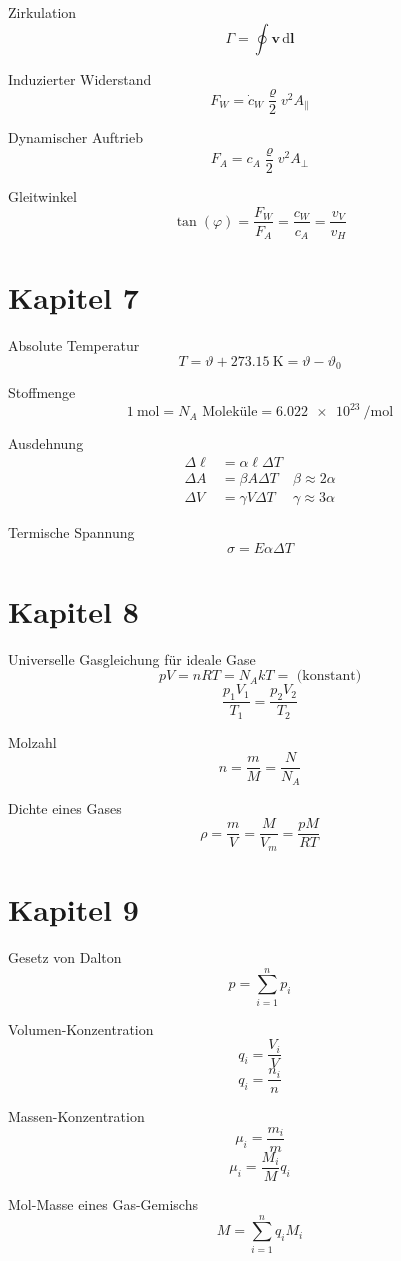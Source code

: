 \documentclass[a4paper, twocolumn]{article}
\numberwithin{equation}{section}
\theoremstyle{hsr-def}
\theoremstyle{hsr-sub}
\theoremstyle{hsr-unnum}
\newcommand{\dd}[1]{\ensuremath{\mathrm{d}#1}}
\newcommand{\di}[1]{\,\dd{#1}}
\renewcommand{\vec}[1]{\ensuremath{\mathbf{#1}}}
\begin{document}
Zirkulation
\[
    \Gamma = \oint \vec{v} \di{\vec{l}}
\]

Induzierter Widerstand
\[
    F_W = \dot{c}_W \frac{\varrho}{2} v^2 A_\parallel
\]

Dynamischer Auftrieb
\[
    F_A = c_A \frac{\varrho}{2} v^2 A_\perp
\]

Gleitwinkel
\[
    \tan(\varphi) = \frac{F_W}{F_A} = \frac{c_W}{c_A} = \frac{v_V}{v_H}
\]

\section*{Kapitel 7}
Absolute Temperatur
\[
    T = \vartheta + \SI{273.15}{\kelvin} = \vartheta - \vartheta_0
\]

Stoffmenge
\[
    \SI{1}{\mole} = N_A \text{ Molek\"ule} = \SI{6.022e23}{\per\mole}
\]

Ausdehnung
\begin{align*}
    \Delta \ell &= \alpha\ell\Delta T \\
    \Delta A &= \beta A \Delta T & \beta \approx 2\alpha \\
    \Delta V &= \gamma V \Delta T & \gamma \approx 3\alpha
\end{align*}

Termische Spannung
\[
    \sigma = E \alpha \Delta T
\]

\section*{Kapitel 8}
Universelle Gasgleichung f\"ur ideale Gase
\[
    pV = nRT = N_A k T = \text{ (konstant)}
\]
\[
    \frac{p_1 V_1}{T_1} = \frac{p_2 V_2}{T_2}
\]

Molzahl
\[
    n = \frac{m}{M} = \frac{N}{N_A}
\]

Dichte eines Gases
\[
    \rho = \frac{m}{V} = \frac{M}{V_m} = \frac{pM}{RT}
\]

\section*{Kapitel 9}
Gesetz von Dalton
\[
    p = \sum_{i = 1}^n p_i
\]

Volumen-Konzentration
\[
    q_i = \frac{V_i}{V}
\]
\[
    q_i = \frac{n_i}{n}
\]

Massen-Konzentration
\[
    \mu_i = \frac{m_i}{m}
\]
\[
    \mu_i = \frac{M_i}{M} q_i
\]

Mol-Masse eines Gas-Gemischs
\[
    M = \sum_{i = 1}^n q_i M_i
\]
\end{document}
